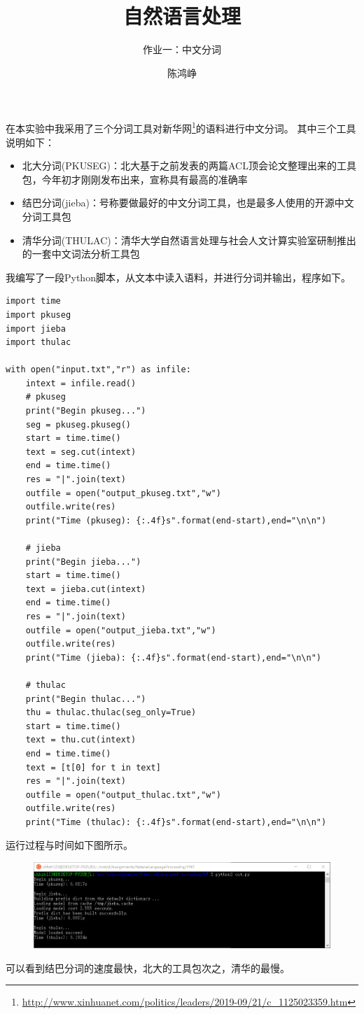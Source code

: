 \documentclass[logo,reportComp]{thesis}
\title{自然语言处理}
\subtitle{作业一：中文分词}
\author{陈鸿峥}
\begin{document}
\maketitle

在本实验中我采用了三个分词工具对新华网\footnote{\url{http://www.xinhuanet.com/politics/leaders/2019-09/21/c_1125023359.htm}}的语料进行中文分词。
其中三个工具说明如下：
\begin{itemize}
	\item 北大分词(PKUSEG)\cite{bib:pkuseg}：北大基于之前发表的两篇ACL顶会论文整理出来的工具包，今年初才刚刚发布出来，宣称具有最高的准确率
	\item 结巴分词(jieba)\cite{bib:jieba}：号称要做最好的中文分词工具，也是最多人使用的开源中文分词工具包
	\item 清华分词(THULAC)\cite{bib:thulac}：清华大学自然语言处理与社会人文计算实验室研制推出的一套中文词法分析工具包
\end{itemize}

我编写了一段Python脚本，从文本中读入语料，并进行分词并输出，程序如下。
\begin{lstlisting}
import time
import pkuseg
import jieba
import thulac

with open("input.txt","r") as infile:
	intext = infile.read()
	# pkuseg
	print("Begin pkuseg...")
	seg = pkuseg.pkuseg()
	start = time.time()
	text = seg.cut(intext)
	end = time.time()
	res = "|".join(text)
	outfile = open("output_pkuseg.txt","w")
	outfile.write(res)
	print("Time (pkuseg): {:.4f}s".format(end-start),end="\n\n")

	# jieba
	print("Begin jieba...")
	start = time.time()
	text = jieba.cut(intext)
	end = time.time()
	res = "|".join(text)
	outfile = open("output_jieba.txt","w")
	outfile.write(res)
	print("Time (jieba): {:.4f}s".format(end-start),end="\n\n")

	# thulac
	print("Begin thulac...")
	thu = thulac.thulac(seg_only=True)
	start = time.time()
	text = thu.cut(intext)
	end = time.time()
	text = [t[0] for t in text]
	res = "|".join(text)
	outfile = open("output_thulac.txt","w")
	outfile.write(res)
	print("Time (thulac): {:.4f}s".format(end-start),end="\n\n")
\end{lstlisting}

运行过程与时间如下图所示。
\begin{figure}[H]
\centering
\includegraphics[width=\linewidth]{runtime.png}
\end{figure}
可以看到结巴分词的速度最快，北大的工具包次之，清华的最慢。
\end{document}
